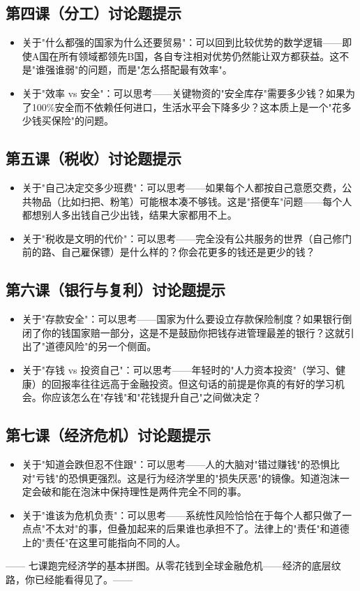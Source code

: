 \documentclass[a4paper,12pt]{ctexart}
\begin{document}
\subsection*{第四课（分工）讨论题提示}
\begin{itemize}
  \item 关于"什么都强的国家为什么还要贸易"：可以回到比较优势的数学逻辑——即使A国在所有领域都领先B国，各自专注相对优势仍然能让双方都获益。这不是"谁强谁弱"的问题，而是"怎么搭配最有效率"。
  \item 关于"效率 vs 安全"：可以思考——关键物资的"安全库存"需要多少钱？如果为了100\%安全而不依赖任何进口，生活水平会下降多少？这本质上是一个"花多少钱买保险"的问题。
\end{itemize}

\subsection*{第五课（税收）讨论题提示}
\begin{itemize}
  \item 关于"自己决定交多少班费"：可以思考——如果每个人都按自己意愿交费，公共物品（比如扫把、粉笔）可能根本凑不够钱。这是"搭便车"问题——每个人都想别人多出钱自己少出钱，结果大家都用不上。
  \item 关于"税收是文明的代价"：可以思考——完全没有公共服务的世界（自己修门前的路、自己雇保镖）是什么样的？你会花更多的钱还是更少的钱？
\end{itemize}

\subsection*{第六课（银行与复利）讨论题提示}
\begin{itemize}
  \item 关于"存款安全"：可以思考——国家为什么要设立存款保险制度？如果银行倒闭了你的钱国家赔一部分，这是不是鼓励你把钱存进管理最差的银行？这就引出了"道德风险"的另一个侧面。
  \item 关于"存钱 vs 投资自己"：可以思考——年轻时的"人力资本投资"（学习、健康）的回报率往往远高于金融投资。但这句话的前提是你真的有好的学习机会。你应该怎么在"存钱"和"花钱提升自己"之间做决定？
\end{itemize}

\subsection*{第七课（经济危机）讨论题提示}
\begin{itemize}
  \item 关于"知道会跌但忍不住跟"：可以思考——人的大脑对"错过赚钱"的恐惧比对"亏钱"的恐惧更强烈。这是行为经济学里的"损失厌恶"的镜像。知道泡沫一定会破和能在泡沫中保持理性是两件完全不同的事。
  \item 关于"谁该为危机负责"：可以思考——系统性风险恰恰在于每个人都只做了一点点"不太对"的事，但叠加起来的后果谁也承担不了。法律上的"责任"和道德上的"责任"在这里可能指向不同的人。
\end{itemize}

\vspace{0.5cm}
\begin{center}
\textcolor{blue!70!black}{\large —— 七课跑完经济学的基本拼图。从零花钱到全球金融危机——经济的底层纹路，你已经能看得见了。——}
\end{center}
\end{document}
